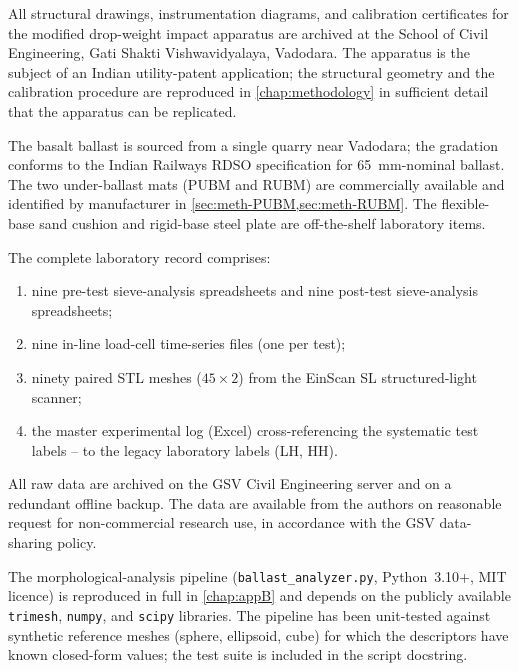 \begin{description}[leftmargin=2.6cm,style=nextline,
                    font=\bfseries\color{gsvblue}]

  \item[Apparatus] All structural drawings, instrumentation diagrams,
    and calibration certificates for the modified drop-weight impact
    apparatus are archived at the School of Civil Engineering, Gati
    Shakti Vishwavidyalaya, Vadodara. The apparatus is the subject of
    an Indian utility-patent application; the structural geometry
    and the calibration procedure are reproduced in
    \cref{chap:methodology} in sufficient detail that the apparatus
    can be replicated.

  \item[Materials] The basalt ballast is sourced from a single
    quarry near Vadodara; the gradation conforms to the Indian
    Railways \gls{RDSO} specification for \SI{65}{\milli\metre}-nominal
    ballast. The two under-ballast mats (\gls{PUBM} and \gls{RUBM})
    are commercially available and identified by manufacturer in
    \cref{sec:meth-PUBM,sec:meth-RUBM}. The flexible-base sand cushion
    and rigid-base steel plate are off-the-shelf laboratory items.

  \item[Raw data] The complete laboratory record comprises:
    \begin{enumerate}
       \item nine pre-test sieve-analysis spreadsheets and nine
             post-test sieve-analysis spreadsheets;
       \item nine in-line load-cell time-series files (one per test);
       \item ninety paired \gls{STL} meshes (\(45 \times 2\)) from
             the EinScan SL structured-light scanner;
       \item the master experimental log (Excel) cross-referencing
             the systematic test labels --
             to the legacy laboratory labels (\acrshort{LH},
             \acrshort{HH}).
    \end{enumerate}
    All raw data are archived on the GSV Civil Engineering server
    and on a redundant offline backup. The data are available from
    the authors on reasonable request for non-commercial research
    use, in accordance with the GSV data-sharing policy.

  \item[Software] The morphological-analysis pipeline
    (\texttt{ballast\_analyzer.py}, Python~3.10+, MIT licence) is
    reproduced in full in \cref{chap:appB} and depends on the
    publicly available \texttt{trimesh}, \texttt{numpy}, and
    \texttt{scipy} libraries. The pipeline has been unit-tested
    against synthetic reference meshes (sphere, ellipsoid, cube) for
    which the descriptors have known closed-form values; the test
    suite is included in the script docstring.


\end{description}
